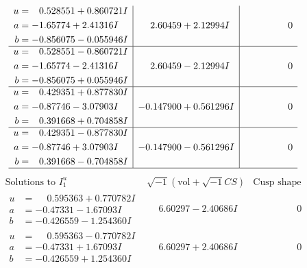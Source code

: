 \documentclass[1p]{elsarticle_modified}
\theoremstyle{definition}
\newcommand{\I}{\sqrt{-1}}
\begin{document}
$$\begin{array}{c|c|c}
\begin{aligned}
u &= \phantom{-}0.528551 + 0.860721 I \\
a &= -1.65774 + 2.41316 I \\
b &= -0.856075 - 0.055946 I\end{aligned}
 & \phantom{-}2.60459 + 2.12994 I & \phantom{-0.000000 } 0 \\ \hline\begin{aligned}
u &= \phantom{-}0.528551 - 0.860721 I \\
a &= -1.65774 - 2.41316 I \\
b &= -0.856075 + 0.055946 I\end{aligned}
 & \phantom{-}2.60459 - 2.12994 I & \phantom{-0.000000 } 0 \\ \hline\begin{aligned}
u &= \phantom{-}0.429351 + 0.877830 I \\
a &= -0.87746 - 3.07903 I \\
b &= \phantom{-}0.391668 + 0.704858 I\end{aligned}
 & -0.147900 + 0.561296 I & \phantom{-0.000000 } 0 \\ \hline\begin{aligned}
u &= \phantom{-}0.429351 - 0.877830 I \\
a &= -0.87746 + 3.07903 I \\
b &= \phantom{-}0.391668 - 0.704858 I\end{aligned}
 & -0.147900 - 0.561296 I & \phantom{-0.000000 } 0\\
 \hline 
 \end{array}$$\newpage$$\begin{array}{c|c|c}  
\text{Solutions to }I^u_{1}& \I (\text{vol} + \sqrt{-1}CS) & \text{Cusp shape}\\
 \hline 
\begin{aligned}
u &= \phantom{-}0.595363 + 0.770782 I \\
a &= -0.47331 - 1.67093 I \\
b &= -0.426559 - 1.254360 I\end{aligned}
 & \phantom{-}6.60297 - 2.40686 I & \phantom{-0.000000 } 0 \\ \hline\begin{aligned}
u &= \phantom{-}0.595363 - 0.770782 I \\
a &= -0.47331 + 1.67093 I \\
b &= -0.426559 + 1.254360 I\end{aligned}
 & \phantom{-}6.60297 + 2.40686 I & \phantom{-0.000000 } 0 \\ \hline\begin{aligned}

\end{aligned}
\end{array}$$
\end{document}
